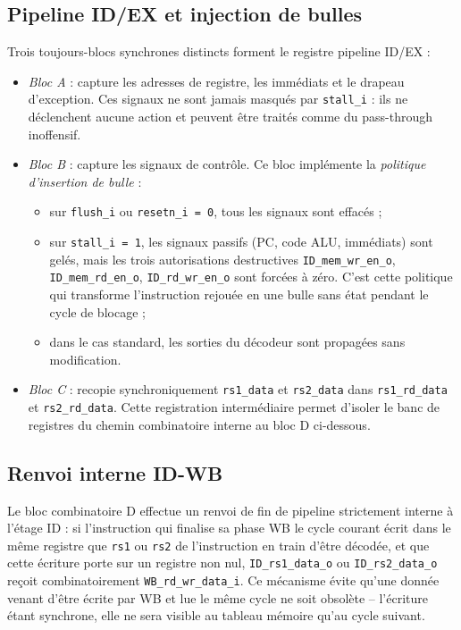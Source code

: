 \documentclass[11pt,a4paper,oneside]{report}
\begin{document}
\subsection{Pipeline ID/EX et injection de bulles}
Trois toujours-blocs synchrones distincts forment le registre
pipeline ID/EX :
\begin{itemize}
  \item \emph{Bloc A} : capture les adresses de registre, les
        immédiats et le drapeau d'exception. Ces signaux ne sont
        jamais masqués par \texttt{stall\_i} : ils ne déclenchent
        aucune action et peuvent être traités comme du
        \og{}pass-through inoffensif\fg{}.
  \item \emph{Bloc B} : capture les signaux de contrôle. Ce bloc
        implémente la \emph{politique d'insertion de bulle} :
        \begin{itemize}
          \item sur \texttt{flush\_i} ou
                \texttt{resetn\_i = 0}, tous les signaux sont
                effacés ;
          \item sur \texttt{stall\_i = 1}, les signaux passifs
                (PC, code ALU, immédiats) sont gelés, mais les
                trois autorisations destructives
                \texttt{ID\_mem\_wr\_en\_o},
                \texttt{ID\_mem\_rd\_en\_o},
                \texttt{ID\_rd\_wr\_en\_o} sont forcées à zéro.
                C'est cette politique qui transforme l'instruction
                rejouée en une bulle sans état pendant le cycle de
                blocage ;
          \item dans le cas standard, les sorties du décodeur sont
                propagées sans modification.
        \end{itemize}
  \item \emph{Bloc C} : recopie synchroniquement
        \texttt{rs1\_data} et \texttt{rs2\_data} dans
        \texttt{rs1\_rd\_data} et \texttt{rs2\_rd\_data}. Cette
        registration intermédiaire permet d'isoler le banc de
        registres du chemin combinatoire interne au bloc D
        ci-dessous.
\end{itemize}

\subsection{Renvoi interne ID-WB}
Le bloc combinatoire D effectue un renvoi de fin de pipeline
strictement interne à l'étage ID : si l'instruction qui finalise
sa phase WB le cycle courant écrit dans le même registre que
\texttt{rs1} ou \texttt{rs2} de l'instruction en train d'être
décodée, et que cette écriture porte sur un registre non nul,
\texttt{ID\_rs1\_data\_o} ou \texttt{ID\_rs2\_data\_o} reçoit
combinatoirement \texttt{WB\_rd\_wr\_data\_i}. Ce mécanisme évite
qu'une donnée venant d'être écrite par WB et lue le même cycle ne
soit obsolète -- l'écriture étant synchrone, elle ne sera visible
au tableau mémoire qu'au cycle suivant.
\end{document}
